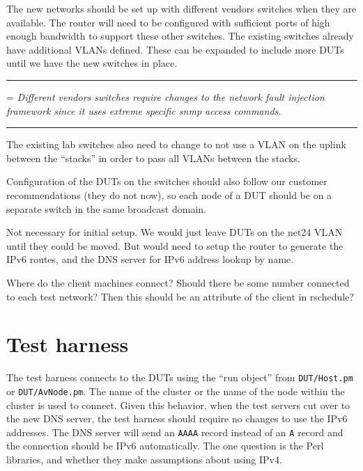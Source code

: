 \documentclass[twoside]{article}
\newenvironment{note}
{\begin{center}\begin{minipage}{0.8\textwidth}
\vspace{2ex}\hrule\vspace{1ex}
\parskip=\medskipamount
\em}
{\par 
\vspace{1ex}\hrule\vspace{2ex}
\end{minipage}\end{center}}
\begin{document}
The new networks should be set up with different vendors switches
when they are available.
The router will need to be configured with sufficient ports of
high enough bandwidth to support these other switches.
The existing switches already have additional VLANs defined.
These can be expanded to include more DUTs until we have the
new switches in place.
\begin{note}
Different vendors switches require changes to the network fault injection
framework since it uses extreme specific snmp access commands.
\end{note}

The existing lab switches also need to change to not use a VLAN on the uplink
between the ``stacks'' in order to pass all VLANs between the stacks.

Configuration of the DUTs on the switches should also follow our
customer recommendations (they do not now), so each node of a DUT
should be on a separate switch in the same broadcast domain.


Not necessary for initial setup.
We would just leave DUTs on the net24 VLAN until they could be moved.
But would need to setup the router to generate the IPv6 routes,
and the DNS server for IPv6 address lookup by name.

Where do the client machines connect?
Should there be some number connected to each test network?
Then this should be an attribute of the client in rschedule?

\section{Test harness}

The test harness connects to the DUTs using the ``run object''
from \verb+DUT/Host.pm+ or \verb+DUT/AvNode.pm+.
The name of the cluster or the name of the node within the
cluster is used to connect.
Given this behavior, when the test servers cut over to the new
DNS server, the test harness should require no changes to use
the IPv6 addresses.
The DNS server will send an \verb+AAAA+ record instead of an \verb+A+ record
and the connection should be IPv6 automatically.
The one question is the Perl libraries, and whether they make assumptions
about using IPv4.
\end{document}

